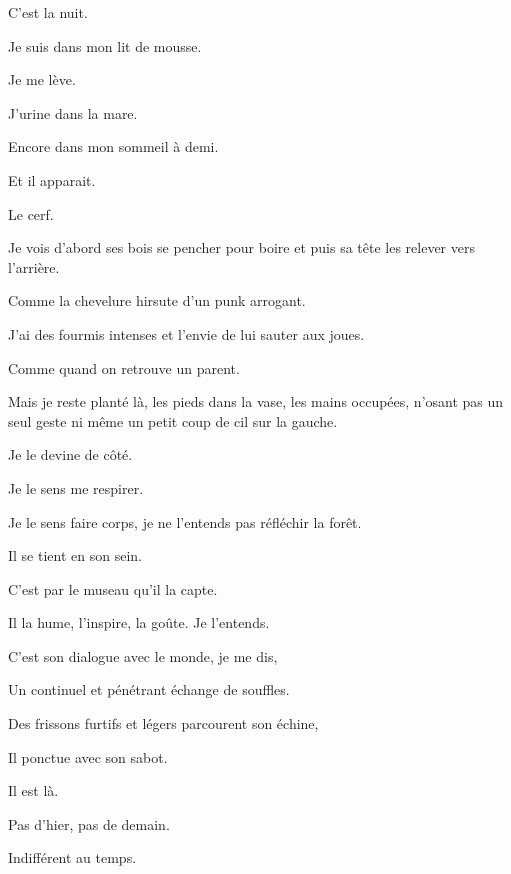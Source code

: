 	{\setlength{\parskip}{0pt}

C’est la nuit.

Je suis dans mon lit de mousse.

Je me lève.

J’urine dans la mare.

Encore dans mon sommeil à demi.

Et il apparait.

Le cerf.

Je vois d’abord ses bois se pencher pour boire et puis sa tête les relever vers 
l’arrière.

Comme la chevelure hirsute d’un punk arrogant.

J’ai des fourmis intenses et l’envie de lui sauter aux joues.

Comme quand on retrouve un parent.

Mais je reste planté là, les pieds dans la vase, les mains occupées, n’osant pas 
un seul geste ni même un petit coup de cil sur la gauche.

Je le devine de côté.

Je le sens me respirer.

Je le sens faire corps, je ne l’entends pas réfléchir la forêt.

Il se tient en son sein.

C’est par le museau qu’il la capte.

Il la hume, l’inspire, la goûte. Je l’entends.

C’est son dialogue avec le monde, je me dis,

Un continuel et pénétrant échange de souffles.

Des frissons furtifs et légers parcourent son échine,

Il ponctue avec son sabot.

Il est là.

Pas d’hier, pas de demain.

Indifférent au temps.

}
